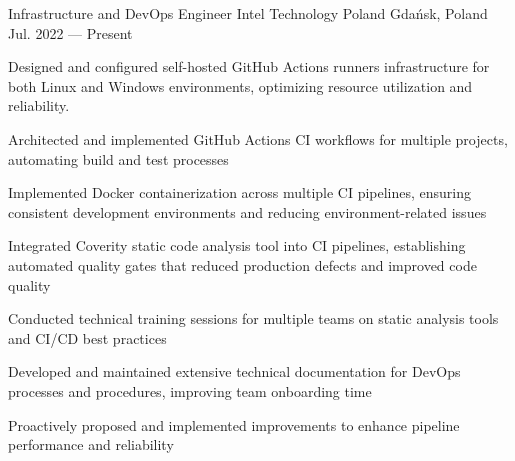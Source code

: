 
\begin{cventries}

    \cventry
    {Infrastructure and DevOps Engineer} %
    {Intel Technology Poland} %
    {Gdańsk, Poland} %
    {Jul. 2022 --- Present} %
    {
        \begin{cvitems} %
        \item Designed and configured self-hosted GitHub Actions runners infrastructure for both Linux and Windows environments, optimizing resource utilization and reliability.
        \item Architected and implemented GitHub Actions CI workflows for multiple projects, automating build and test processes
        \item Implemented Docker containerization across multiple CI pipelines, ensuring consistent development environments and reducing environment-related issues
        \item Integrated Coverity static code analysis tool into CI pipelines, establishing automated quality gates that reduced production defects and improved code quality
        \item Conducted technical training sessions for multiple teams on static analysis tools and CI/CD best practices
        \item Developed and maintained extensive technical documentation for DevOps processes and procedures, improving team onboarding time
        \item Proactively proposed and implemented improvements to enhance pipeline performance and reliability
        \end{cvitems}
    }


\end{cventries}
